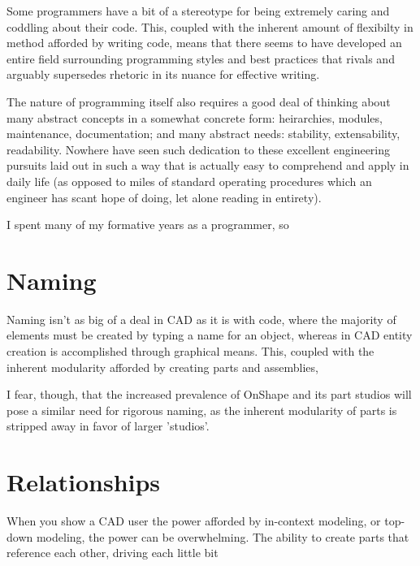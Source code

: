 Some programmers have a bit of a stereotype for being extremely caring and coddling about their code. This, coupled with the inherent amount of flexibilty in method afforded by writing code, means that there seems to have developed an entire field surrounding programming styles and best practices that rivals and arguably supersedes rhetoric in its nuance for effective writing.

The nature of programming itself also requires a good deal of thinking about many abstract concepts in a somewhat concrete form: heirarchies, modules, maintenance, documentation; and many abstract needs: stability, extensability, readability. Nowhere have seen such dedication to these excellent engineering pursuits laid out in such a way that is actually easy to comprehend and apply in daily life (as opposed to miles of standard operating procedures which an engineer has scant hope of doing, let alone reading in entirety). 

I spent many of my formative years as a programmer, so


\section{Naming}
Naming isn't as big of a deal in CAD as it is with code, where the majority of elements must be created by typing a name for an object, whereas in CAD entity creation is accomplished through graphical means. This, coupled with the inherent modularity afforded by creating parts and assemblies, 

I fear, though, that the increased prevalence of OnShape and its part studios will pose a similar need for rigorous naming, as the inherent modularity of parts is stripped away in favor of larger 'studios'.

\section{Relationships}

When you show a CAD user the power afforded by in-context modeling, or top-down modeling, the power can be overwhelming. The ability to create parts that reference each other, driving each little bit
